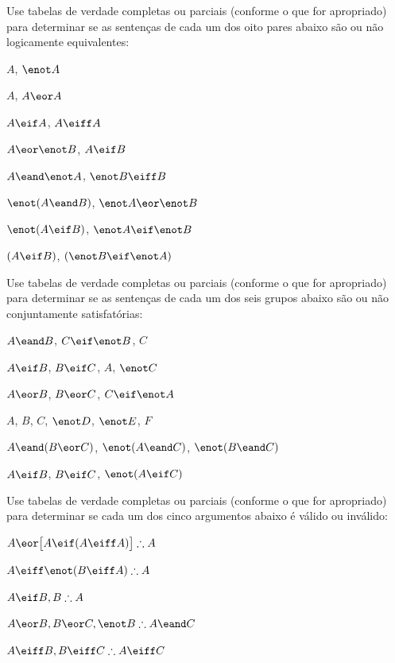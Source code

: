 \practiceproblems
\solutions

\solutions
\problempart
\label{pr.TT.equiv3}
Use tabelas de verdade completas ou parciais (conforme o que for apropriado) para determinar se as sentenças de cada um dos oito pares abaixo são ou não logicamente equivalentes:
\begin{earg}
\item $A$, $\enot A$ %
\item $A$, $A \eor A$ %
\item $A\eif A$, $A \eiff A$ %
\item $A \eor \enot B$, $A\eif B$ %
\item $A \eand \enot A$, $\enot B \eiff B$ %
\item $\enot(A \eand B)$, $\enot A \eor \enot B$ %
\item $\enot(A \eif B)$, $\enot A \eif \enot B$ %
\item $(A \eif B)$, $(\enot B \eif \enot A)$ %
\end{earg}

\solutions
\problempart
\label{pr.TT.satisfiable4}
Use tabelas de verdade completas ou parciais (conforme o que for apropriado) para determinar se as sentenças de cada um dos seis grupos abaixo são ou não conjuntamente satisfatórias:
\begin{earg}
\item $A \eand B$, $C\eif \enot B$, $C$ %
\item $A\eif B$, $B\eif C$, $A$, $\enot C$ %
\item $A \eor B$, $B\eor C$, $C\eif \enot A$ %
\item $A$, $B$, $C$, $\enot D$, $\enot E$, $F$ %
\item $A \eand (B \eor C)$, $\enot(A \eand C)$, $\enot(B \eand C)$ %
\item $A \eif B$, $B \eif C$, $\enot(A \eif C)$ %
\end{earg}

\solutions
\problempart
\label{pr.TT.valid4}
Use tabelas de verdade completas ou parciais (conforme o que for apropriado) para determinar se cada um dos cinco argumentos abaixo é válido ou inválido:
\begin{earg}
\item $A\eor\bigl[A\eif(A\eiff A)\bigr] \therefore A$ %
\item $A\eiff\enot(B\eiff A) \therefore A$ %
\item $A\eif B, B \therefore A$ %
\item $A\eor B, B\eor C, \enot B \therefore A \eand C$ %
\item $A\eiff B, B\eiff C \therefore A\eiff C$ %
\end{earg}

